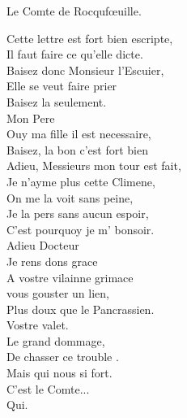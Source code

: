 \documentclass{article}
\begin{document}
\begin{ekddrama}
\begin{speech}
Le Comte de Rocqufœuille.

Cette lettre est fort bien escripte,\\
Il faut faire ce qu’elle dicte.\\
Baisez donc Monsieur l’Escuier,\\
Elle se veut faire prier\\
Baisez la seulement.\\
Mon Pere\app{\lem[wit=A]{,}\rdg[wit=B, alt=\emph{om.}]{}}\\
Ouy ma fille il est necessaire,\\
Baisez, la bon c'est fort bien \\
Adieu, Messieurs\app{\lem[wit=A]{,}\rdg[wit=B, alt=\emph{om.}]{}} mon tour est fait,\\
Je n'ayme plus cette Climene,\\
On me la voit  sans peine,\\
Je la pers sans aucun espoir,\\
C'est pourquoy je m'\app{\lem[wit=A]{,}\rdg[wit=B, alt=\emph{om.}]{}} bonsoir.\\
Adieu Docteur\\
Je rens dons grace\app{\lem[wit=A]{,}\rdg[wit=B]{;}}\\
A vostre vilainne grimace\\
 vous gouster un lien,\\
Plus doux que le Pancrassien.\\
Vostre valet.\\
Le grand dommage,\\
De chasser ce trouble .\\
Mais qui nous  si fort.\\
C’est le Comte...\\
Qui.\\
\end{speech}

\end{ekddrama}
\end{document}
